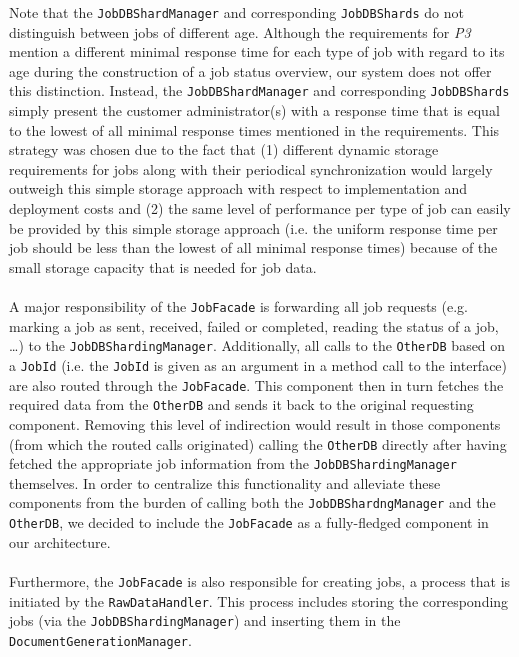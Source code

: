 \documentclass[a4paper,10pt]{article}
\begin{document}
Note that the \texttt{JobDBShardManager} and corresponding \texttt{JobDBShards} do not distinguish between jobs of different age. Although the requirements for \textit{P3} mention a different minimal response time for each type of job with regard to its age during the construction of a job status overview, our system does not offer this distinction. Instead, the \texttt{JobDBShardManager} and corresponding \texttt{JobDBShards} simply present the customer administrator(s) with a response time that is equal to the lowest of all minimal response times mentioned in the requirements. This strategy was chosen due to the fact that (1) different dynamic storage requirements for jobs along with their periodical synchronization would largely outweigh this simple storage approach with respect to implementation and deployment costs and (2) the same level of performance per type of job can easily be provided by this simple storage approach (i.e. the uniform response time per job should be less than the lowest of all minimal response times) because of the small storage capacity that is needed for job data.\\\\
A major responsibility of the \texttt{JobFacade} is forwarding all job requests (e.g. marking a job as sent, received, failed or completed, reading the status of a job, \dots) to the \texttt{JobDBShardingManager}. Additionally, all calls to the \texttt{OtherDB} based on a \texttt{JobId} (i.e. the \texttt{JobId} is given as an argument in a method call to the interface) are also routed through the \texttt{JobFacade}. This component then in turn fetches the required data from the \texttt{OtherDB} and sends it back to the original requesting component. Removing this level of indirection would result in those components (from which the routed calls originated) calling the \texttt{OtherDB} directly after having fetched the appropriate job information from the \texttt{JobDBShardingManager} themselves. In order to centralize this functionality and alleviate these components from the burden of calling both the \texttt{JobDBShardngManager} and the \texttt{OtherDB}, we decided to include the \texttt{JobFacade} as a fully-fledged component in our architecture.\\\\
Furthermore, the \texttt{JobFacade} is also responsible for creating jobs, a process that is initiated by the \texttt{RawDataHandler}. This process includes storing the corresponding jobs (via the \texttt{JobDBShardingManager}) and inserting them in the \texttt{DocumentGenerationManager}.
\end{document}
